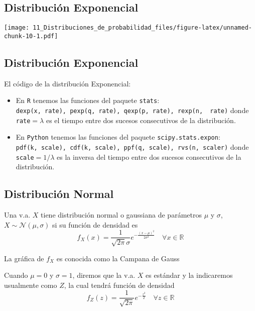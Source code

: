 \documentclass[
]{article}
\providecommand{\tightlist}{%
  \setlength{\itemsep}{0pt}\setlength{\parskip}{0pt}}
\begin{document}
\hypertarget{distribuciuxf3n-exponencial-2}{%
\subsection{Distribución
Exponencial}\label{distribuciuxf3n-exponencial-2}}

\texttt{[image: 11\_Distribuciones\_de\_probabilidad\_files/figure-latex/unnamed-chunk-10-1.pdf]}

\hypertarget{distribuciuxf3n-exponencial-3}{%
\subsection{Distribución
Exponencial}\label{distribuciuxf3n-exponencial-3}}

El código de la distribución Exponencial:

\begin{itemize}
\tightlist
\item
  En \texttt{R} tenemos las funciones del paquete \texttt{stats}:
  \texttt{dexp(x,\ rate),\ pexp(q,\ rate),\ qexp(p,\ rate),\ rexp(n,\ \ rate)}
  donde \texttt{rate}\(=\lambda\) es el tiempo entre dos sucesos
  consecutivos de la distribución.
\item
  En \texttt{Python} tenemos las funciones del paquete
  \texttt{scipy.stats.expon}:
  \texttt{pdf(k,\ scale),\ cdf(k,\ scale),\ ppf(q,\ scale),\ rvs(n,\ scaler)}
  donde \texttt{scale}\(=1/\lambda\) es la inversa del tiempo entre dos
  sucesos consecutivos de la distribución.
\end{itemize}

\hypertarget{distribuciuxf3n-normal}{%
\subsection{Distribución Normal}\label{distribuciuxf3n-normal}}

Una v.a. \(X\) tiene distribución normal o gaussiana de parámetros
\(\mu\) y \(\sigma\), \(X\sim\mathcal{N}(\mu,\sigma)\) si su función de
densidad es
\[f_X(x)=\frac{1}{\sqrt{2\pi}\sigma}e^{-\frac{(x-\mu)^2}{2\sigma^2}}\quad \forall x\in\mathbb{R}\]

La gráfica de \(f_X\) es conocida como la Campana de Gauss

Cuando \(\mu = 0\) y \(\sigma = 1\), diremos que la v.a. \(X\) es
estándar y la indicaremos usualmente como \(Z\), la cual tendrá función
de densidad
\[f_Z(z)=\frac{1}{\sqrt{2\pi}}e^{-\frac{z^2}{2}}\quad \forall z\in\mathbb{R}\]
\end{document}
